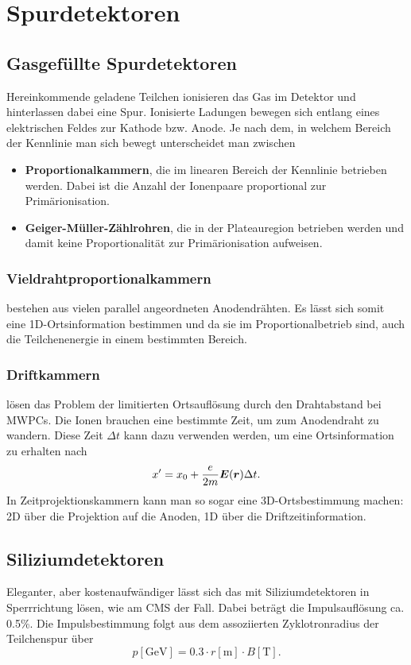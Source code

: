 \section{Spurdetektoren}
\subsection{Gasgefüllte Spurdetektoren}
Hereinkommende geladene Teilchen ionisieren das Gas im Detektor und hinterlassen dabei eine Spur.
Ionisierte Ladungen bewegen sich entlang eines elektrischen Feldes zur Kathode bzw. Anode.
Je nach dem, in welchem Bereich der Kennlinie man sich bewegt unterscheidet man zwischen
\begin{itemize}
	\item \textbf{Proportionalkammern}, die im linearen Bereich der Kennlinie betrieben werden. Dabei ist die Anzahl der Ionenpaare proportional zur Primärionisation.
	\item \textbf{Geiger-Müller-Zählrohren}, die in der Plateauregion betrieben werden und damit keine Proportionalität zur Primärionisation aufweisen.
\end{itemize}
\subsubsection{Vieldrahtproportionalkammern}
bestehen aus vielen parallel angeordneten Anodendrähten. Es lässt sich somit eine 1D-Ortsinformation bestimmen und da sie im Proportionalbetrieb sind, auch die Teilchenenergie in einem bestimmten Bereich.

\subsubsection{Driftkammern}
lösen das Problem der limitierten Ortsauflösung durch den Drahtabstand bei MWPCs. Die Ionen brauchen eine bestimmte Zeit, um zum Anodendraht zu wandern. Diese Zeit $\Delta t$ kann dazu verwenden werden, um eine Ortsinformation zu erhalten nach
\begin{equation*}
	x' = x_0 + \frac{e}{2m}\boldsymbol{E}(\boldsymbol{r})\Delta t.
\end{equation*}
In Zeitprojektionskammern kann man so sogar eine 3D-Ortsbestimmung machen: 2D über die Projektion auf die Anoden, 1D über die Driftzeitinformation.

\subsection{Siliziumdetektoren}
Eleganter, aber kostenaufwändiger lässt sich das mit Siliziumdetektoren in Sperrrichtung lösen, wie am CMS der Fall.
Dabei beträgt die Impulsauflösung ca. 0.5\%.
Die Impulsbestimmung folgt aus dem assoziierten Zyklotronradius der Teilchenspur über
\begin{equation*}
	p[\si{\GeV}] = 0.3\cdot r[\si{\meter}] \cdot B[\si{\tesla}].
\end{equation*}

